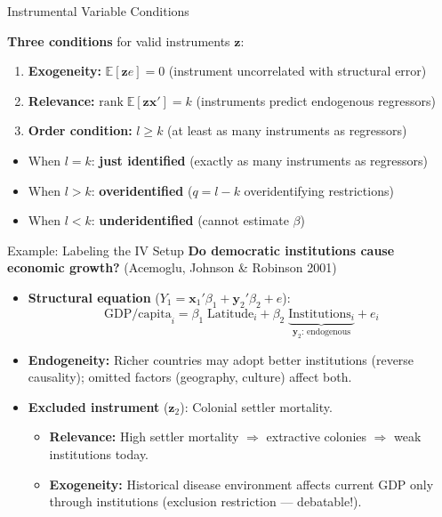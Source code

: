 \documentclass[aspectratio=169, handout]{beamer}
\numberwithin{equation}{section}
\begin{document}
\begin{frame}{Instrumental Variable Conditions}
\begin{tcolorbox}[colback=blue!5, colframe=blue!50]
\textbf{Three conditions} for valid instruments $\bm{z}$:
\begin{enumerate}
\item \textbf{Exogeneity:}  $\mathbb{E}[\bm{z}e]=0$ \quad (instrument uncorrelated with structural error)
\item \textbf{Relevance:}  $\text{rank}\;\mathbb{E}[\bm{z}\bm{x}']=k$ \quad (instruments predict endogenous regressors)
\item \textbf{Order condition:}  $l\geq k$ \quad (at least as many instruments as regressors)
\end{enumerate}
\end{tcolorbox}
\vspace{0.2cm}
\begin{itemize}
\item When $l=k$: \textbf{just identified} (exactly as many instruments as regressors)
\item When $l>k$: \textbf{overidentified} ($q=l-k$ overidentifying restrictions)
\item When $l<k$: \textbf{underidentified} (cannot estimate $\beta$)
\end{itemize}
\end{frame}


\begin{frame}{Example: Labeling the IV Setup}
\textbf{Do democratic institutions cause economic growth?} (Acemoglu, Johnson \& Robinson 2001)
\vspace{0.2cm}
\begin{itemize}
\item \textbf{Structural equation} ($Y_1 = \bm{x}_1'\beta_1 + \bm{y}_2'\beta_2 + e$):
$$\text{GDP/capita}_i = \beta_1\;\text{Latitude}_i + \beta_2\;\underbrace{\text{Institutions}_i}_{\bm{y}_2\text{: endogenous}} + e_i$$
\item \textbf{Endogeneity:} Richer countries may adopt better institutions (reverse causality); omitted factors (geography, culture) affect both.
\item \textbf{Excluded instrument} ($\bm{z}_2$): Colonial settler mortality.
\begin{itemize}
\item \textbf{Relevance:} High settler mortality $\Rightarrow$ extractive colonies $\Rightarrow$ weak institutions today.
\item \textbf{Exogeneity:} Historical disease environment affects current GDP only through institutions (exclusion restriction --- debatable!).
\end{itemize}
\end{itemize}
\end{frame}
\end{document}
